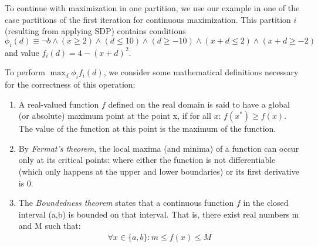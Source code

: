 To continue with maximization in one partition, we use our
\MarsRoverNL example in one of the case partitions of the first iteration for
continuous maximization.  This partition $i$ (resulting from applying SDP)
contains conditions $\phi_i(d) \equiv \neg b\wedge
(x\geq 2)\wedge (d\leq 10) \wedge (d\geq -10)\wedge (x+d\leq 2) \wedge
(x+d\geq -2) $ and value $f_i(d) = 4 - (x+d)^2 $.

To perform $\max_d \phi_i f_i(d)$, we consider some mathematical
definitions necessary for the correctness of this operation:
\begin{enumerate}
\item A real-valued function $f$ defined on the real domain is said to
have a global (or absolute) maximum point at the point x, if for all $x$:
$ f(x^{*}) \geq f(x) $. The value of the function at this point is
the maximum of the function.
\item By \emph{Fermat's theorem}, the local maxima (and minima) of a function
can occur only at its critical points: where either the function is not
differentiable (which only happens at the upper and lower boundaries) or its
first derivative is 0.
\item The \emph{Boundedness theorem} states that a continuous function
$f$ in the closed interval (a,b) is bounded on that interval. That is,
there exist real numbers m and M such that:
\begin{align*}
\forall x \in \{a,b\} : m \leq f(x) \leq M 
\end{align*}
\end{enumerate}

